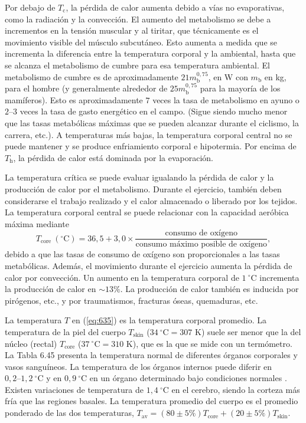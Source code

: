 \documentclass[12pt]{book}
\begin{document}
Por debajo de $T_{\text{c}}$, la pérdida de calor aumenta debido a vías no evaporativas, como la radiación y la convección. El aumento del metabolismo se debe a incrementos en la tensión muscular y al tiritar, que técnicamente es el movimiento visible del músculo subcutáneo. Esto aumenta a medida que se incrementa la diferencia entre la temperatura corporal y la ambiental, hasta que se alcanza el metabolismo de cumbre para esa temperatura ambiental. El metabolismo de cumbre es de aproximadamente $21 m_{\text{b}}^{0{,}75}$, en W con $m_{\text{b}}$ en kg, para el hombre (y generalmente alrededor de $25 m_{\text{b}}^{0{,}75}$ para la mayoría de los mamíferos). Esto es aproximadamente $7$ veces la tasa de metabolismo en ayuno o $2\text{--}3$ veces la tasa de gasto energético en el campo. (Sigue siendo mucho menor que las tasas metabólicas máximas que se pueden alcanzar durante el ciclismo, la carrera, etc.). A temperaturas más bajas, la temperatura corporal central no se puede mantener y se produce enfriamiento corporal e hipotermia. Por encima de $T_{\text{h}}$, la pérdida de calor está dominada por la evaporación.

La temperatura crítica se puede evaluar igualando la pérdida de calor y la producción de calor por el metabolismo. Durante el ejercicio, también deben considerarse el trabajo realizado y el calor almacenado o liberado por los tejidos. La temperatura corporal central se puede relacionar con la capacidad aeróbica máxima mediante
\begin{equation}
T_{\text{core}}\ (^\circ\text{C}) = 36{,}5 + 3{,}0 \times \frac{\text{consumo de oxígeno}}{\text{consumo máximo posible de oxígeno}},
\label{eq:671}
\end{equation}
debido a que las tasas de consumo de oxígeno son proporcionales a las tasas metabólicas. Además, el movimiento durante el ejercicio aumenta la pérdida de calor por convección. Un aumento en la temperatura corporal de $1\ ^\circ\text{C}$ incrementa la producción de calor en $\sim 13\%$. La producción de calor también es inducida por pirógenos, etc., y por traumatismos, fracturas óseas, quemaduras, etc.

La temperatura $T$ en (\ref{eq:635}) es la temperatura corporal promedio. La temperatura de la piel del cuerpo $T_{\text{skin}}$ ($34\ ^\circ\text{C} = 307\text{ K}$) suele ser menor que la del núcleo (rectal) $T_{\text{core}}$ ($37\ ^\circ\text{C} = 310\text{ K}$), que es la que se mide con un termómetro. La Tabla 6.45 presenta la temperatura normal de diferentes órganos corporales y vasos sanguíneos. La temperatura de los órganos internos puede diferir en $0{,}2\text{--}1{,}2\ ^\circ\text{C}$ y en $0{,}9\ ^\circ\text{C}$ en un órgano determinado bajo condiciones normales \cite{38}. Existen variaciones de temperatura de $1{,}4\ ^\circ\text{C}$ en el cerebro, siendo la corteza más fría que las regiones basales. La temperatura promedio del cuerpo es el promedio ponderado de las dos temperaturas, $T_{\text{av}} = (80 \pm 5\%) T_{\text{core}} + (20 \pm 5\%) T_{\text{skin}}$.
\end{document}
